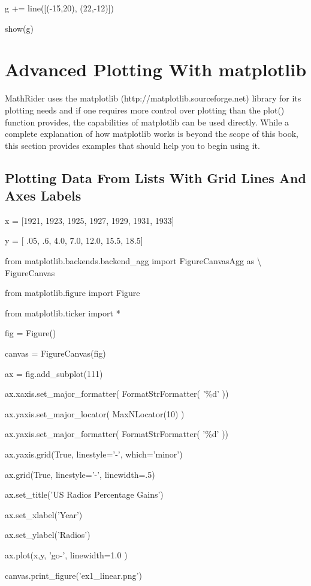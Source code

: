 \documentclass[12pt,oneside]{book}
\begin{document}
g += line([({}-15,20), (22,{}-12)])

show(g)

{\textbar}
\section[Advanced Plotting With matplotlib]{Advanced Plotting With matplotlib}

MathRider uses the matplotlib (http://matplotlib.sourceforge.net) library for its plotting needs and if one requires more control over plotting than the plot() function provides, the capabilities of matplotlib can be used directly. While a complete explanation of how matplotlib works is beyond the scope of this book, this section provides examples that should help you to begin using it.

\subsection[Plotting Data From Lists With Grid Lines And Axes Labels]{ Plotting Data From Lists With Grid Lines And Axes Labels} 

x = [1921, 1923, 1925, 1927, 1929, 1931, 1933]

y = [ .05, .6, 4.0, 7.0, 12.0, 15.5, 18.5]


from matplotlib.backends.backend\_agg import FigureCanvasAgg as {\textbackslash} FigureCanvas

from matplotlib.figure import Figure

from matplotlib.ticker import *

fig = Figure()

canvas = FigureCanvas(fig)

ax = fig.add\_subplot(111)

ax.xaxis.set\_major\_formatter( FormatStrFormatter( '\%d' ))

ax.yaxis.set\_major\_locator( MaxNLocator(10) )

ax.yaxis.set\_major\_formatter( FormatStrFormatter(
'\%d' ))

ax.yaxis.grid(True, linestyle='{}-',
which='minor')

ax.grid(True, linestyle='{}-',
linewidth=.5)

ax.set\_title('US Radios Percentage
Gains')

ax.set\_xlabel('Year')

ax.set\_ylabel('Radios')

ax.plot(x,y, 'go{}-', linewidth=1.0 )

canvas.print\_figure('ex1\_linear.png')
\end{document}
